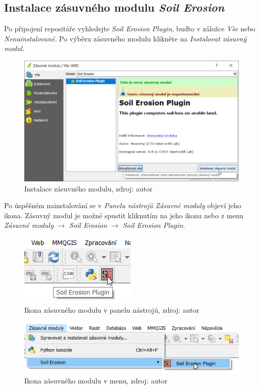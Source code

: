 \subsection{Instalace zásuvného modulu \textit{Soil Erosion}} Po
připojení repositáře vyhledejte \textit{Soil Erosion Plugin}, buďto v
záložce \textit{Vše} nebo \textit{Nenainstalované}. Po výběru
zásuvného modulu klikněte na \textit{Instalovat zásuvný modul}.

	\begin{figure}[H] \centering
		\includegraphics[width=.8\textwidth]{./pictures/instalace_pluginu.png}
		\caption[Instalace zásuvného modulu]{Instalace
zásuvného modulu, zdroj: autor}
		\label{fig:manual_pridani_repozitare_geoforall_lab}
 	\end{figure}
	
Po úspěšném nainstalování se v \textit{Panelu nástrojů Zásuvné moduly}
objeví jeho ikona. Zásuvný modul je možné spustit kliknutím na jeho
ikonu nebo z menu \textit{Zásuvné moduly} $\rightarrow$ \textit{Soil
Erosion} $\rightarrow$ \textit{Soil Erosion Plugin}.
	
	\begin{figure}[H] \centering
		\includegraphics[width=.3\textwidth]{./pictures/spusteni_pluginu2.png}
		\caption[Ikona zásuvného modulu v panelu
nástrojů]{Ikona zásuvného modulu v panelu nástrojů, zdroj: autor}
		\label{ikona_modulu_v_panelu_nastroju}
 	\end{figure}
	
	\begin{figure}[H] \centering
		\includegraphics[width=.7\textwidth]{./pictures/spusteni_pluginu1.png}
		\caption[Ikona zásuvného modulu v menu]{Ikona
zásuvného modulu v menu, zdroj: autor}
		\label{ikona_modulu_v_panelu_nastroju2}
 	\end{figure}

